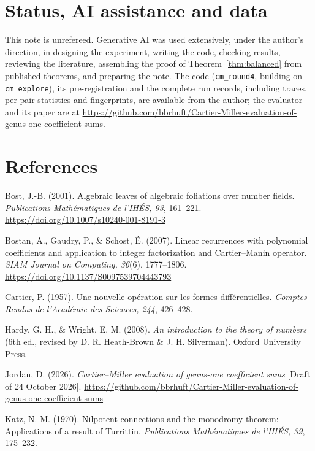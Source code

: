 \documentclass[11pt,a4paper]{article}
\numberwithin{equation}{section}
\theoremstyle{plain}
\theoremstyle{definition}
\begin{document}
\section*{Status, AI assistance and data}
This note is unrefereed. Generative AI was used extensively, under the author's direction, in designing the experiment, writing the code, checking results, reviewing the literature, assembling the proof of Theorem~\ref{thm:balanced} from published theorems, and preparing the note. The code (\texttt{cm\_round4}, building on \texttt{cm\_explore}), its pre-registration and the complete run records, including traces, per-pair statistics and fingerprints, are available from the author; the evaluator and its paper are at \url{https://github.com/bbrhuft/Cartier-Miller-evaluation-of-genus-one-coefficient-sums}.

\section*{References}
\begingroup\small
\makeatletter\@afterindenttrue\makeatother
\setlength{\parindent}{-1.5em}
\setlength{\leftskip}{1.5em}
\setlength{\parskip}{1.5pt}

Bost, J.-B. (2001). Algebraic leaves of algebraic foliations over number fields. \emph{Publications Math\'ematiques de l'IH\'ES, 93}, 161--221. \url{https://doi.org/10.1007/s10240-001-8191-3}

Bostan, A., Gaudry, P., \& Schost, \'E. (2007). Linear recurrences with polynomial coefficients and application to integer factorization and Cartier--Manin operator. \emph{SIAM Journal on Computing, 36}(6), 1777--1806. \url{https://doi.org/10.1137/S0097539704443793}

Cartier, P. (1957). Une nouvelle op\'eration sur les formes diff\'erentielles. \emph{Comptes Rendus de l'Acad\'emie des Sciences, 244}, 426--428.

Hardy, G. H., \& Wright, E. M. (2008). \emph{An introduction to the theory of numbers} (6th ed., revised by D. R. Heath-Brown \& J. H. Silverman). Oxford University Press.

Jordan, D. (2026). \emph{Cartier--Miller evaluation of genus-one coefficient sums} [Draft of 24 October 2026]. \url{https://github.com/bbrhuft/Cartier-Miller-evaluation-of-genus-one-coefficient-sums}

Katz, N. M. (1970). Nilpotent connections and the monodromy theorem: Applications of a result of Turrittin. \emph{Publications Math\'ematiques de l'IH\'ES, 39}, 175--232.
\end{document}

